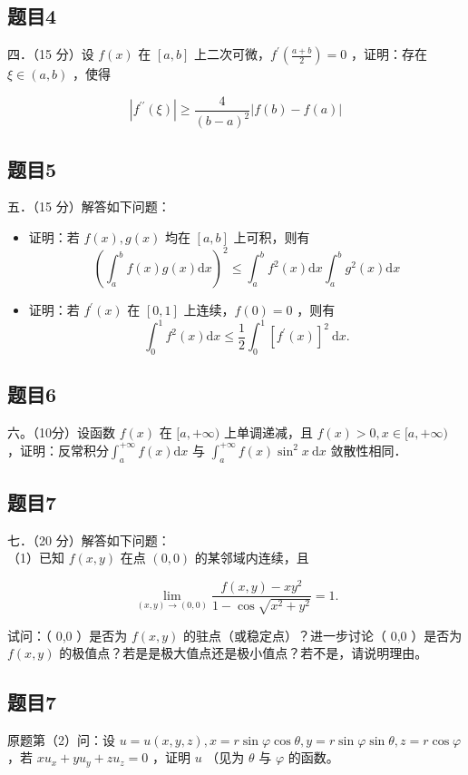 \documentclass{article}
\begin{document}
\subsection{题目4}
四．（15 分）设 \(f(x)\) 在 \([a, b]\) 上二次可微，\(f^{\prime}\left(\frac{a+b}{2}\right)=0\) ，证明：存在 \(\xi \in(a, b)\) ，使得

\[
\left|f^{\prime \prime}(\xi)\right| \geq \frac{4}{(b-a)^{2}}|f(b)-f(a)|
\]

\subsection{题目5}
五．（15 分）解答如下问题：

\begin{itemize}
  \item[（1）] 证明：若 \(f(x), g(x)\) 均在 \([a, b]\) 上可积，则有
\[
\left(\int_{a}^{b} f(x) g(x) \mathrm{d} x\right)^{2} \leq \int_{a}^{b} f^{2}(x) \mathrm{d} x \int_{a}^{b} g^{2}(x) \mathrm{d} x
\]
  \item[（2）] 证明：若 \(f^{\prime}(x)\) 在 \([0,1]\) 上连续，\(f(0)=0\) ，则有
\[
\int_{0}^{1} f^{2}(x) \mathrm{d} x \leq \frac{1}{2} \int_{0}^{1}\left[f^{\prime}(x)\right]^{2} \mathrm{~d} x .
\]
\end{itemize}

\subsection{题目6}
六。（10分）设函数 \(f(x)\) 在 \([a,+\infty)\) 上单调递减，且 \(f(x)>0, x \in[a,+\infty)\) ，证明：反常积分\(\int_{a}^{+\infty} f(x) \mathrm{d} x\) 与 \(\int_{a}^{+\infty} f(x) \sin ^{2} x \mathrm{~d} x\) 敛散性相同．

\subsection{题目7}
七．（20 分）解答如下问题：\\
（1）已知 \(f(x, y)\) 在点 \((0,0)\) 的某邻域内连续，且

\[
\lim _{(x, y) \rightarrow(0,0)} \frac{f(x, y)-x y^{2}}{1-\cos \sqrt{x^{2}+y^{2}}}=1 .
\]

试问：（ 0,0 ）是否为 \(f(x, y)\) 的驻点（或稳定点）？进一步讨论（ 0,0 ）是否为 \(f(x, y)\) 的极值点？若是是极大值点还是极小值点？若不是，请说明理由。\\

\subsection{题目7}
原题第（2）问：设 \(u=u(x, y, z), x=r \sin \varphi \cos \theta, y=r \sin \varphi \sin \theta, z=r \cos \varphi\) ，若 \(x u_{x}+y u_{y}+z u_{z}=0\) ，证明 \(u\) （见为 \(\theta\) 与 \(\varphi\) 的函数。
\end{document}
